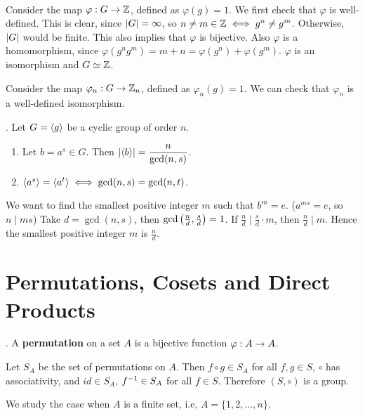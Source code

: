 \pf \\
 Consider the map \(\varphi: G \rightarrow \mathbb{Z}\), defined as \(\varphi(g) = 1\). We first check that \(\varphi\) is well-defined. This is clear, since \(\left| G \right| = \infty\), so \(n \neq m \in \mathbb{Z} \iff g^n \neq g^m\). Otherwise, \(\left| G \right|\) would be finite. This also implies that \(\varphi\) is bijective. Also \(\varphi\) is a homomorphism, since \(\varphi(g^n g^m) = m + n = \varphi(g^n) + \varphi(g^m)\). \(\varphi\) is an isomorphism and \(G \simeq \mathbb{Z}\).

 Consider the map \(\varphi_n: G \rightarrow \mathbb{Z}_n\), defined as \(\varphi_n(g) = 1\). We can check that \(\varphi_n\) is a well-defined isomorphism.

\thm. Let \(G = \left\langle g \right\rangle\) be a cyclic group of order \(n\).
\begin{enumerate}
    \item Let \(b = a^s \in G\). Then \(\left| \left\langle b \right\rangle \right| = \dfrac{n}{\gcd(n, s)}\).
    \item \(\left\langle a^s \right\rangle = \left\langle a^t \right\rangle \iff \gcd(n, s) = \gcd(n, t)\).
\end{enumerate}

\pf
{} We want to find the smallest positive integer \(m\) such that \(b^m = e\). (\(a^{ms} = e\), so \(n \mid ms\)) Take \(d = \gcd(n, s)\), then \(\gcd\left( \frac{n}{d}, \frac{s}{d} \right) = 1\). If \(\frac{n}{d} \mid \frac{s}{d}\cdot m\), then \(\frac{n}{d} \mid m\). Hence the smallest positive integer \(m\) is \(\frac{n}{d}\).

\chapter{Permutations, Cosets and Direct Products}

\setcounter{topic}{7}

.  A \textbf{permutation} on a set \(A\) is a bijective function \(\varphi: A \rightarrow A\).

\rmk Let \(S_A\) be the set of permutations on \(A\). Then \(f \circ g \in S_A\) for all \(f, g \in S\), \(\circ\) has associativity, and \(id \in S_A\), \(f^{-1} \in S_A\) for all \(f \in S\). Therefore \((S, \circ)\) is a group.

We study the case when \(A\) is a finite set, i.e, \(A = \{1, 2, \dots, n\}\).

\pagebreak
